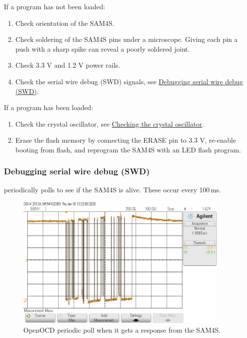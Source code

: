 If a program has not been loaded:

\begin{enumerate}
\item
  Check orientation of the SAM4S.
\item
  Check soldering of the SAM4S pins under a microscope. Giving
  each pin a push with a sharp spike can reveal a poorly soldered joint.
\item
  Check 3.3 V and 1.2 V power rails.
\item
  Check the serial wire debug (SWD) signals, see
  \protect\hyperref[debugging]{Debugging serial wire debug (SWD)}.
\end{enumerate}

If a program has been loaded:

\begin{enumerate}
\item
  Check the crystal oscillator, see
  \protect\hyperref[checking-the-crystal-oscillator]{Checking the
  crystal oscillator}.
\item
  Erase the flash memory by connecting the ERASE pin to 3.3 V, re-enable
  booting from flash, and reprogram the SAM4S with an LED flash
  program.
\end{enumerate}

\subsubsection{Debugging serial wire debug (SWD)}
\label{debugging-serial-wire-debug-swd}

 periodically polls to see if the SAM4S is alive.
These occur every 100\,ms.

\begin{figure}
\centering
\includegraphics[height=2.60417in]{figs/OpenOCDPollingGood.png}
\caption{OpenOCD periodic poll when it gets a response from the SAM4S.}
\end{figure}


